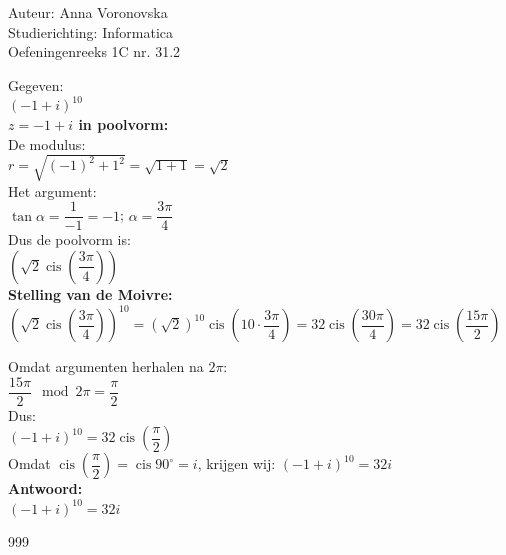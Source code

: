 \documentclass[a4paper]{article}
\begin{document}
\noindent \large Auteur: Anna Voronovska \\
\noindent \large Studierichting: Informatica \\
\noindent \large Oefeningenreeks 1C nr. 31.2 \\

\bigskip 

\normalsize
Gegeven:\\
 
$ (-1 + i)^{10} $\\

\textbf{$z = -1 + i$ in poolvorm:}\\

De modulus:\\

$ r = \sqrt{(-1)^2 + 1^2} = \sqrt{1 + 1} = \sqrt{2} $\\

Het argument:\\

$ \tan \alpha = \dfrac{1}{-1} = -1 $;
$ \alpha = \dfrac{3\pi}{4} $\\

Dus de poolvorm is:\\

$\left( \sqrt{2} \operatorname{cis} \left(\dfrac{3\pi}{4}\right) \right)$\\


\textbf{Stelling van de Moivre:}\\

$\left(\sqrt{2} \operatorname{cis} \left(\dfrac{3\pi}{4}\right) \right)^{10} =
\left(\sqrt{2}\right)^{10} \operatorname{cis} \left(10 \cdot \dfrac{3\pi}{4} \right) =
32 \operatorname{cis} \left(\dfrac{30\pi}{4}\right) = 32 \operatorname{cis} \left(\dfrac{15\pi}{2}\right)$

Omdat argumenten herhalen na $ 2\pi $:\\

$ \dfrac{15\pi}{2} \mod 2\pi  = \dfrac{\pi}{2} $\\

Dus:\\

$ (-1 + i)^{10} = 32 \operatorname{cis} \left(\dfrac{\pi}{2}\right) $\\

Omdat $ \operatorname{cis} \left(\dfrac{\pi}{2}\right) = \operatorname{cis} 90^\circ = i $, krijgen wij:
$ (-1 + i)^{10} = 32i $\\

\textbf{Antwoord:}\\

$ (-1 + i)^{10} = 32i $\\

\begin{thebibliography}{999}
\end{thebibliography}
\end{document}
